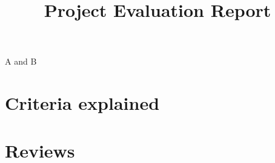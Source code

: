 \documentclass[11pt]{article}
\title{Project \projectnum{} Evaluation Report}
\newcommand{\students}{A and B}
\begin{document}
\maketitle

 \students

\section{Criteria explained}



\section{Reviews}






\end{document}
